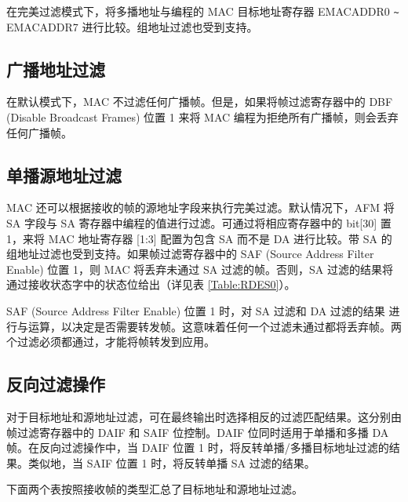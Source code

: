 \documentclass[main\_\_CN.tex]{subfiles}
\begin{document}
在完美过滤模式下，将多播地址与编程的 MAC 目标地址寄存器 EMACADDR0 \verb+~+ EMACADDR7 进行比较。组地址过滤也受到支持。

\subsection{广播地址过滤 }
在默认模式下，MAC 不过滤任何广播帧。但是，如果将帧过滤寄存器中的 DBF (Disable Broadcast Frames) 位置 1 来将 MAC 编程为拒绝所有广播帧，则会丢弃任何广播帧。

\subsection{单播源地址过滤 }
MAC 还可以根据接收的帧的源地址字段来执行完美过滤。默认情况下，AFM 将 SA 字段与 SA 寄存器中编程的值进行过滤。可通过将相应寄存器中的 bit[30] 置 1，来将 MAC 地址寄存器 [1:3] 配置为包含 SA 而不是 DA 进行比较。带 SA 的组地址过滤也受到支持。如果帧过滤寄存器中的 SAF (Source Address Filter Enable) 位置 1，则 MAC 将丢弃未通过 SA 过滤的帧。否则，SA 过滤的结果将通过接收状态字中的状态位给出（详见表 \ref{Table:RDES0}）。

SAF (Source Address Filter Enable) 位置 1 时，对 SA 过滤和 DA 过滤的结果 进行与运算，以决定是否需要转发帧。这意味着任何一个过滤未通过都将丢弃帧。两个过滤必须都通过，才能将帧转发到应用。

\subsection{反向过滤操作 }
对于目标地址和源地址过滤，可在最终输出时选择相反的过滤匹配结果。这分别由帧过滤寄存器中的 DAIF 和 SAIF 位控制。DAIF 位同时适用于单播和多播 DA 帧。在反向过滤操作中，当 DAIF 位置 1 时，将反转单播/多播目标地址过滤的结果。类似地，当 SAIF 位置 1 时，将反转单播 SA 过滤的结果。

下面两个表按照接收帧的类型汇总了目标地址和源地址过滤。
\end{document}
